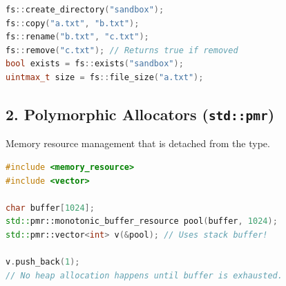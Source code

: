 \begin{lstlisting}[language={C++}]
fs::create_directory("sandbox");
fs::copy("a.txt", "b.txt");
fs::rename("b.txt", "c.txt");
fs::remove("c.txt"); // Returns true if removed
bool exists = fs::exists("sandbox");
uintmax_t size = fs::file_size("a.txt");
\end{lstlisting}

\hypertarget{polymorphic-allocators-stdpmr}{%
\subsection{\texorpdfstring{2. Polymorphic Allocators
(\texttt{std::pmr})}{2. Polymorphic Allocators (std::pmr)}}\label{polymorphic-allocators-stdpmr}}

Memory resource management that is detached from the type.

\begin{lstlisting}[language={C++}]
#include <memory_resource>
#include <vector>

char buffer[1024];
std::pmr::monotonic_buffer_resource pool(buffer, 1024);
std::pmr::vector<int> v(&pool); // Uses stack buffer!

v.push_back(1);
// No heap allocation happens until buffer is exhausted.
\end{lstlisting}
